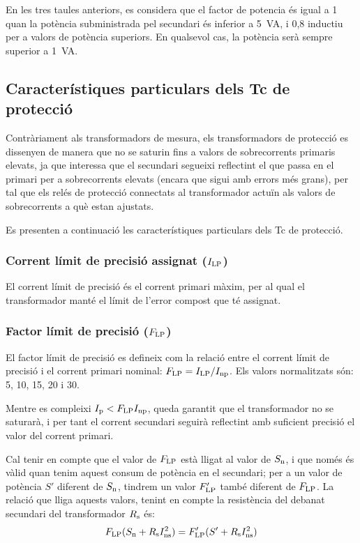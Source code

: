 En les tres taules anteriors, es considera que el factor de
potencia és igual a 1 quan la potència subministrada pel secundari és inferior a \SI{5}{VA}, i 0,8 inductiu per a valors de potència superiors. En qualsevol cas, la potència serà sempre superior a \SI{1}{VA}.


\subsection{Característiques particulars dels Tc de protecció}

Contràriament als transformadors de mesura, els transformadors de
protecció es dissenyen de manera que no se saturin fins a  valors
de sobrecorrents primaris elevats, ja que interessa que el
secundari segueixi reflectint el que passa en el primari per a
 sobrecorrents elevats (encara que sigui amb errors més grans), per
tal que els relés de protecció connectats al transformador actuïn
als valors de sobrecorrents a què estan ajustats.

Es presenten a continuació les característiques particulars dels Tc
de protecció.

\subsubsection{Corrent límit de precisió assignat ($I_\mathrm{LP}$)}

El corrent
límit de precisió és el corrent primari màxim, per al qual el transformador manté el límit
de l'error compost que té assignat.

\subsubsection{Factor límit de precisió ($F_\mathrm{LP}$) }

 El factor límit de precisió
es defineix com la relació entre el corrent límit de precisió
i el corrent primari nominal: $F_\mathrm{LP} = I_\mathrm{LP} /I_\mathrm{np}$.
Els valors normalitzats són: 5, 10, 15, 20 i 30.

Mentre es compleixi  $I_\mathrm{p}<F_\mathrm{LP} I_\mathrm{np}$, queda garantit
que el transformador no se saturarà, i per tant el corrent
secundari seguirà reflectint amb suficient precisió el valor del
corrent primari.

Cal tenir en compte que el valor de $F_\mathrm{LP}$ està lligat
 al valor de $S_\mathrm{n}$, i que només és vàlid
quan tenim aquest consum de  potència en el secundari; per a un
valor de potència $S'$ diferent de $S_\mathrm{n}$, tindrem un valor
$F'_\mathrm{LP}$ també diferent de  $F_\mathrm{LP}$. La relació que
lliga aquests valors, tenint en compte la resistència del debanat
secundari del transformador  $R_\mathrm{s}$ és:
\begin{equation}\label{eq:flp}
    F_\mathrm{LP} (S_\mathrm{n}+R_\mathrm{s}I_\mathrm{ns}^2) =
    F'_\mathrm{LP} (S'+R_\mathrm{s}I_\mathrm{ns}^2)
\end{equation}

